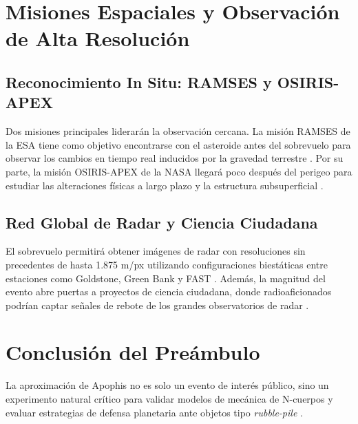 \documentclass[a4paper]{article}
\begin{document}
\section{Misiones Espaciales y Observación de Alta Resolución}

\subsection{Reconocimiento In Situ: RAMSES y OSIRIS-APEX}
Dos misiones principales liderarán la observación cercana. La misión RAMSES de la ESA tiene como objetivo encontrarse con el asteroide antes del sobrevuelo para observar los cambios en tiempo real inducidos por la gravedad terrestre \cite{esa2024apophis, esa2024ramses}. Por su parte, la misión OSIRIS-APEX de la NASA llegará poco después del perigeo para estudiar las alteraciones físicas a largo plazo y la estructura subsuperficial \cite{esa2024apophis, kim2023tidal}.

\subsection{Red Global de Radar y Ciencia Ciudadana}
El sobrevuelo permitirá obtener imágenes de radar con resoluciones sin precedentes de hasta 1.875 m/px utilizando configuraciones biestáticas entre estaciones como Goldstone, Green Bank y FAST \cite{vallejo2022conditions, kim2023tidal}. Además, la magnitud del evento abre puertas a proyectos de ciencia ciudadana, donde radioaficionados podrían captar señales de rebote de los grandes observatorios de radar \cite{vallejo2022conditions}.

\section{Conclusión del Preámbulo}
La aproximación de Apophis no es solo un evento de interés público, sino un experimento natural crítico para validar modelos de mecánica de N-cuerpos y evaluar estrategias de defensa planetaria ante objetos tipo \textit{rubble-pile} \cite{broz2026apophis, scheeres2023proximity, esa2024ramses}.



\end{document}
